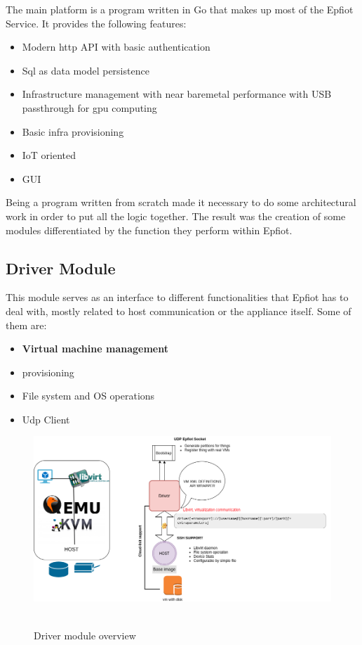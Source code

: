 The main platform is a program written in Go that makes up most of the Epfiot Service.
It provides the following features:
\begin{itemize}
    \item Modern http API with basic authentication
    \item Sql as data model persistence
    \item Infrastructure management with near baremetal performance with USB passthrough for gpu computing
    \item Basic infra provisioning
    \item IoT oriented
    \item GUI
\end{itemize}

Being a program written from scratch made it necessary to do some architectural work in order to put all the logic together. The result was the creation of some modules differentiated by the function they perform within Epfiot.

\newpage
\subsection{Driver Module}
This module serves as an interface to different functionalities that Epfiot has to deal with, mostly related to host communication or the appliance itself. Some of them are:
\begin{itemize}
    \item \textbf{Virtual machine management}
    \item provisioning
    \item File system and OS operations
    \item Udp Client
\end{itemize}

\begin{figure}[h!]%
\centering
    \includegraphics[width=6.0in]{figures/driver.png}
~\caption{Driver module overview}
\label{figure4.2}
\end{figure}

